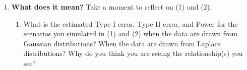 \documentclass{article}\usepackage[]{graphicx}\usepackage[]{xcolor}
\makeatletter
\newcommand{\hlnum}[1]{\textcolor[rgb]{0.686,0.059,0.569}{#1}}%
\newcommand{\hlopt}[1]{\textcolor[rgb]{0,0,0}{#1}}%
\newcommand{\hldef}[1]{\textcolor[rgb]{0.345,0.345,0.345}{#1}}%
\newcommand{\hlkwb}[1]{\textcolor[rgb]{0.69,0.353,0.396}{#1}}%
\newcommand{\hlkwd}[1]{\textcolor[rgb]{0.737,0.353,0.396}{\textbf{#1}}}%
\newenvironment{kframe}{%
 \def\at@end@of@kframe{}%
 \ifinner\ifhmode%
  \def\at@end@of@kframe{\end{minipage}}%
  \begin{minipage}{\columnwidth}%
 \fi\fi%
 \def\FrameCommand##1{\hskip\@totalleftmargin \hskip-\fboxsep
 \colorbox{shadecolor}{##1}\hskip-\fboxsep
     \hskip-\linewidth \hskip-\@totalleftmargin \hskip\columnwidth}%
 \MakeFramed {\advance\hsize-\width
   \@totalleftmargin\z@ \linewidth\hsize
   \@setminipage}}%
 {\par\unskip\endMakeFramed%
 \at@end@of@kframe}
\newenvironment{knitrout}{}{} %
\makeatother
\begin{document}
\begin{enumerate}
\begin{enumerate}
\begin{knitrout}\scriptsize
{}\color{fgcolor}\begin{kframe}
\begin{alltt}
\hldef{(power_F_lap} \hlkwb{<-} \hlkwd{mean}\hldef{(F.stat_lap} \hlopt{>=} \hldef{rejection_point_F))}
\end{alltt}
\begin{verbatim}
## [1] 0.469
\end{verbatim}
\begin{alltt}
\hldef{(type2_F_lap} \hlkwb{<-} \hlnum{1} \hlopt{-} \hldef{power_F_lap)}
\end{alltt}
\begin{verbatim}
## [1] 0.531
\end{verbatim}
\begin{alltt}
\hldef{(power_H_lap} \hlkwb{<-} \hlkwd{mean}\hldef{(H.stat_lap} \hlopt{>=} \hldef{rejection_point_H))}
\end{alltt}
\begin{verbatim}
## [1] 0.64
\end{verbatim}
\begin{alltt}
\hldef{(type2_H_lap} \hlkwb{<-} \hlnum{1} \hlopt{-} \hldef{power_H_lap)}
\end{alltt}
\begin{verbatim}
## [1] 0.36
\end{verbatim}
\end{kframe}
\end{knitrout}

\textcolor{red}{The power increases when the data is Laplace distributed. This makes sense as the Kruskal-Wallis test doesn't assume normality within each group.}


\end{enumerate} 
\item \textbf{What does it mean?} Take a moment to reflect on (1) and (2).
\begin{enumerate}
\item What is the estimated Type I error, Type II error, and Power for the
scenarios you simulated in (1) and (2) when the data are drawn from Gaussian 
distributions? When the data are drawn from Laplace distributions? Why
do you think you are seeing the relationship(s) you see?


\end{enumerate}
\end{enumerate}
\end{document}
